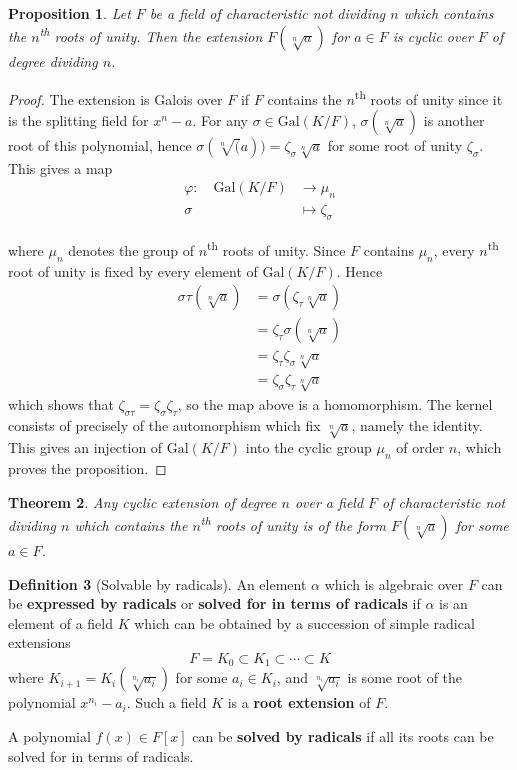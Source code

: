 \documentclass[10pt, oneside, reqno]{amsart}
\theoremstyle{plain}%
\newtheorem{thm}{Theorem}[section]
\newtheorem{prop}[thm]{Proposition}
\theoremstyle{definition}
\newtheorem{defn}[thm]{Definition}
\theoremstyle{remark}
\newcommand{\al}{\alpha}
\newcommand{\gal}[2]{\text{Gal}(#1/#2)}
\newcommand{\mapping}[5]{\begin{align*}
    #1 : \quad     #2 &\rightarrow #3 \\
            #4  &\mapsto #5
\end{align*}    
}
\begin{document}
\begin{prop}
    Let $F$ be a field of characteristic not dividing $n$ which contains the $n$\textsuperscript{th} roots of unity.  Then the extension $F(\sqrt[n]{a})$ for $a \in F$ is cyclic over $F$ of degree dividing $n$.
\end{prop}
\begin{proof}
    The extension is Galois over $F$ if $F$ contains the $n$\textsuperscript{th} roots of unity since it is the splitting field for $x^n - a$.  For any $\sigma \in \gal{K}{F}$, $\sigma(\sqrt[n]{a})$ is another root of this polynomial, hence $\sigma(\sqrt[n](a)) = \zeta_\sigma \sqrt[n]{a}$ for some root of unity $\zeta_\sigma$.  This gives a map \mapping{\varphi}{\gal{K}{F}}{\mu_n}{\sigma}{\zeta_\sigma}
    where $\mu_n$ denotes the group of $n$\textsuperscript{th} roots of unity.  Since $F$ contains $\mu_n$, every $n$\textsuperscript{th} root of unity is fixed by every element of $\gal{K}{F}$.  Hence \begin{align*}
        \sigma \tau (\sqrt[n]{a}) &= \sigma(\zeta_\tau \sqrt[n]{a}) \\
                                    &= \zeta_\tau \sigma(\sqrt[n]{a}) \\
                                    &= \zeta_\tau \zeta_\sigma \sqrt[n]{a} \\
                                    &= \zeta_\sigma \zeta_\tau \sqrt[n]{a}
    \end{align*}
    which shows that $\zeta_{\sigma \tau} = \zeta_\sigma \zeta_\tau$, so the map above is a homomorphism.  The kernel consists of precisely of the automorphism which fix $\sqrt[n]{a}$, namely the identity.  This gives an injection of $\gal{K}{F}$ into the cyclic group $\mu_n$ of order $n$, which proves the proposition.
\end{proof}

\begin{thm}
    Any cyclic extension of degree $n$ over a field $F$ of characteristic not dividing $n$ which contains the $n$\textsuperscript{th} roots of unity is of the form $F(\sqrt[n]{a})$ for some $a \in F$.
\end{thm}

\begin{defn}[Solvable by radicals]
    An element $\al$ which is algebraic over $F$ can be \textbf{expressed by radicals} or \textbf{solved for in terms of radicals} if $\alpha$ is an element of a field $K$ which can be obtained by a succession of simple radical extensions
\[
    F = K_0 \subset K_1 \subset \cdots \subset K
\]
where $K_{i+1} = K_i(\sqrt[n_i]{a_i})$ for some $a_i \in K_i$, and $\sqrt[n_i]{a_i}$ is some root of the polynomial $x^{n_i} - a_i$.  Such a field $K$ is a \textbf{root extension} of $F$. 

A polynomial $f(x) \in F[x]$ can be \textbf{solved by radicals} if all its roots can be solved for in terms of radicals.
\end{defn}
\end{document}
